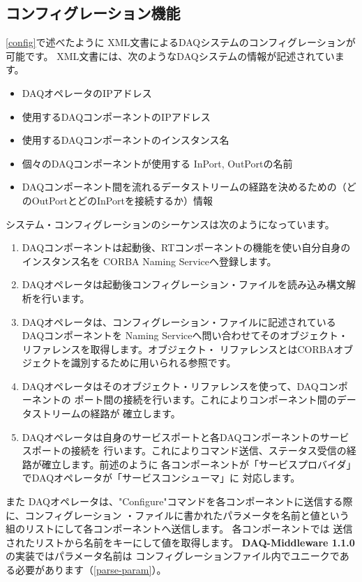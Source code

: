 \documentclass[a4j,10pt,dvips,onecolumn,oneside,final]{jarticle}%
\newcommand {\daqmwcurrent} {
	{\bf DAQ-Middleware 1.1.0}
}
\begin{document}
\subsection{コンフィグレーション機能}\label{operator-config}
\ref{config}で述べたように XML文書によるDAQシステムのコンフィグレーションが可能です。
XML文書には、次のようなDAQシステムの情報が記述されています。
\begin{itemize}
\item DAQオペレータのIPアドレス
\item 使用するDAQコンポーネントのIPアドレス
\item 使用するDAQコンポーネントのインスタンス名
\item 個々のDAQコンポーネントが使用する InPort, OutPortの名前
\item DAQコンポーネント間を流れるデータストリームの経路を決めるための（どのOutPortとどのInPortを接続するか）情報
\end{itemize}

システム・コンフィグレーションのシーケンスは次のようになっています。
\begin{enumerate}
\item DAQコンポーネントは起動後、RTコンポーネントの機能を使い自分自身のインスタンス名を 
  CORBA Naming Serviceへ登録します。
\item DAQオペレータは起動後コンフィグレーション・ファイルを読み込み構文解析を行います。
\item DAQオペレータは、コンフィグレーション・ファイルに記述されているDAQコンポーネントを
Naming Serviceへ問い合わせてそのオブジェクト・リファレンスを取得します。オブジェクト・
リファレンスとはCORBAオブジェクトを識別するために用いられる参照です。
\item DAQオペレータはそのオブジェクト・リファレンスを使って、DAQコンポーネントの
  ポート間の接続を行います。これによりコンポーネント間のデータストリームの経路が
  確立します。
\item DAQオペレータは自身のサービスポートと各DAQコンポーネントのサービスポートの接続を
  行います。これによりコマンド送信、ステータス受信の経路が確立します。前述のように
  各コンポーネントが「サービスプロバイダ」でDAQオペレータが「サービスコンシューマ」に
  対応します。
\end{enumerate}

また DAQオペレータは、"Configure"コマンドを各コンポーネントに送信する際に、コンフィグレーション
・ファイルに書かれたパラメータを名前と値という組のリストにして各コンポーネントへ送信します。
各コンポーネントでは
送信されたリストから名前をキーにして値を取得します。\daqmwcurrent の実装ではパラメータ名前は
コンフィグレーションファイル内でユニークである必要があります（\ref{parse-param}）。
\end{document}
